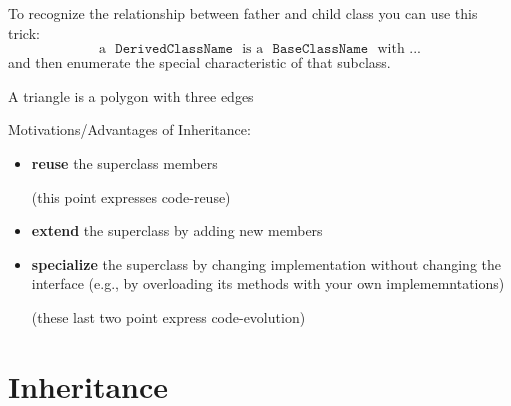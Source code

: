 \begin{itemize}
\begin{marker}
To recognize the relationship between father and child class you can use this trick:
\begin{equation*}
\text{a }\texttt{ DerivedClassName } \text{ is a } \texttt{ BaseClassName } \text{ with ...}
\end{equation*}
and then enumerate the special characteristic of that subclass.

\medskip

 A triangle is a polygon with three edges
\end{marker}

Motivations/Advantages of Inheritance:
\begin{itemize}[$\rightarrow$]
    \item \textbf{reuse} the superclass members

    \footnotesize{(this point expresses code-reuse)}

    \normalsize

    \item \textbf{extend} the superclass by adding new members

    \item \textbf{specialize} the superclass by changing implementation without changing the interface (e.g., by overloading its methods with your own implememntations)

    \footnotesize{(these last two point express code-evolution)}
\end{itemize}

\end{itemize}


\newpage

\section{Inheritance} %
\label{sec:inheritance}

